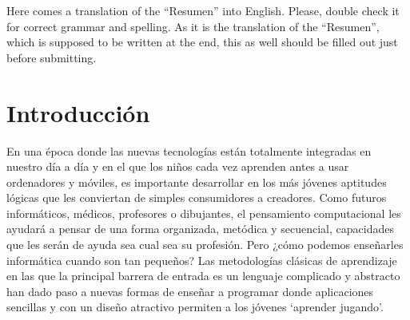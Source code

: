 \documentclass[a4paper, 12pt]{book}
\begin{document}
Here comes a translation of the ``Resumen'' into English. Please, double check
it for correct grammar and spelling. As it is the translation of the ``Resumen'',
which is supposed to be written at the end, this as well should be filled out
just before submitting.




\tableofcontents 
\cleardoublepage
\listoffigures %



\cleardoublepage
\chapter{Introducción}
\label{sec:intro} %

En una época donde las nuevas tecnologías están totalmente integradas en nuestro día a día y en el que los niños cada vez aprenden antes a usar ordenadores y móviles, es importante desarrollar en los más jóvenes aptitudes lógicas que les conviertan de simples consumidores a creadores. 
Como futuros informáticos, médicos, profesores o dibujantes, el pensamiento computacional les ayudará a pensar de una forma organizada, metódica y secuencial, capacidades que les serán de ayuda sea cual sea su profesión. Pero ¿cómo podemos enseñarles informática cuando son tan pequeños? Las metodologías clásicas de aprendizaje en las que la principal barrera de entrada es un lenguaje complicado y abstracto han dado paso a nuevas formas de enseñar a programar donde aplicaciones sencillas y con un diseño atractivo permiten a los jóvenes `aprender jugando'.
\end{document}
